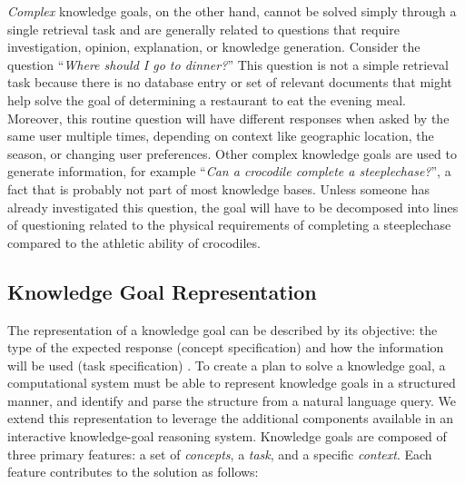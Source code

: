 \documentclass{llncs}
\begin{document}
\textit{Complex} knowledge goals, on the other hand, cannot be solved simply through a single retrieval task and are generally related to questions that require investigation, opinion, explanation, or knowledge generation. Consider the question ``\textit{Where should I go to dinner?}'' This question is not a simple retrieval task because there is no database entry or set of relevant documents that might help solve the goal of determining a restaurant to eat the evening meal. Moreover, this routine question will have different responses when asked by the same user multiple times, depending on context like geographic location, the season, or changing user preferences. Other complex knowledge goals are used to generate information, for example ``\textit{Can a crocodile complete a steeplechase?}'', a fact that is probably not part of most knowledge bases. Unless someone has already investigated this question, the goal will have to be decomposed into lines of questioning related to the physical requirements of completing a steeplechase compared to the athletic ability of crocodiles.


\subsection{Knowledge Goal Representation}

The representation of a knowledge goal can be described by its objective: the type of the expected response (concept specification) and how the information will be used (task specification) \cite{ram_theory_1991}. To create a plan to solve a knowledge goal, a computational system must be able to represent knowledge goals in a structured manner, and identify and parse the structure from a natural language query. We extend this representation to leverage the additional components available in an interactive knowledge-goal reasoning system. Knowledge goals are composed of three primary features: a set of \textit{concepts}, a \textit{task}, and a specific \textit{context}. Each feature contributes to the solution as follows:
\end{document}
